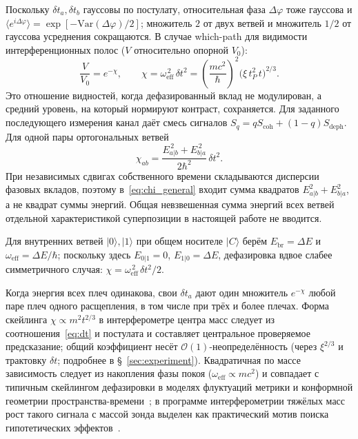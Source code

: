 \documentclass[12pt,a4paper]{article}
\begin{document}
Поскольку $\delta t_a,\delta t_b$ гауссовы по постулату, относительная фаза $\Delta\varphi$ тоже гауссова и $\langle e^{i\Delta\varphi}\rangle=\exp[-\mathrm{Var}(\Delta\varphi)/2]$; множитель $2$ от двух ветвей и множитель $1/2$ от гауссова усреднения сокращаются. В случае which-path для видимости интерференционных полос ($V$ относительно опорной $V_0$):
\begin{equation}
\boxed{\;\frac{V}{V_0}=e^{-\chi},
\qquad
\chi=\omega_{\mathrm{eff}}^{\,2}\,\delta t^2
=\left(\frac{mc^2}{\hbar}\right)^{2}\!\bigl(\xi\,t_P^2\,t\bigr)^{2/3}.\;}
\label{eq:chi}
\end{equation}
Это отношение видностей, когда дефазированный вклад не модулирован, а средний уровень, на который нормируют контраст, сохраняется. Для заданного последующего измерения канал даёт смесь сигналов $S_q=qS_{\mathrm{coh}}+(1-q)S_{\mathrm{deph}}$.
Для одной пары ортогональных ветвей
\begin{equation}
\boxed{\;
\chi_{ab}=\frac{E_{a|b}^{\,2}+E_{b|a}^{\,2}}{2\hbar^2}\,\delta t^2.
\;}
\label{eq:chi_general}
\end{equation}
При независимых сдвигах собственного времени складываются дисперсии фазовых вкладов, поэтому в~\eqref{eq:chi_general} входит сумма квадратов $E_{a|b}^2+E_{b|a}^2$, а не квадрат суммы энергий. Общая невзвешенная сумма энергий всех ветвей отдельной характеристикой суперпозиции в настоящей работе не вводится.

Для внутренних ветвей $|0\rangle,|1\rangle$ при общем носителе $|C\rangle$ берём $E_{\mathrm{br}}=\Delta E$ и $\omega_{\mathrm{eff}}=\Delta E/\hbar$; поскольку здесь $E_{0|1}=0$, $E_{1|0}=\Delta E$, дефазировка вдвое слабее симметричного случая: $\chi=\omega_{\mathrm{eff}}^{\,2}\,\delta t^2/2$.

Когда энергия всех плеч одинакова, свои $\delta t_a$ дают один множитель $e^{-\chi}$ любой паре плеч одного расщепления, в том числе при трёх и более плечах. Форма скейлинга $\chi\propto m^2 t^{2/3}$ в интерферометре центра масс следует из соотношения~\eqref{eq:dt} и постулата и составляет центральное проверяемое предсказание; общий коэффициент несёт $\mathcal O(1)$-неопределённость (через $\xi^{2/3}$ и трактовку $\delta t$; подробнее в \S~\ref{sec:experiment}). Квадратичная по массе зависимость следует из накопления фазы покоя ($\omega_{\mathrm{eff}}\propto mc^2$) и совпадает с типичным скейлингом дефазировки в моделях флуктуаций метрики и конформной геометрии пространства-времени~\cite{bonifacio2009,breuer2009}; в программе интерферометрии тяжёлых масс рост такого сигнала с массой зонда выделен как практический мотив поиска гипотетических эффектов~\cite{kialka2022}.
\end{document}
